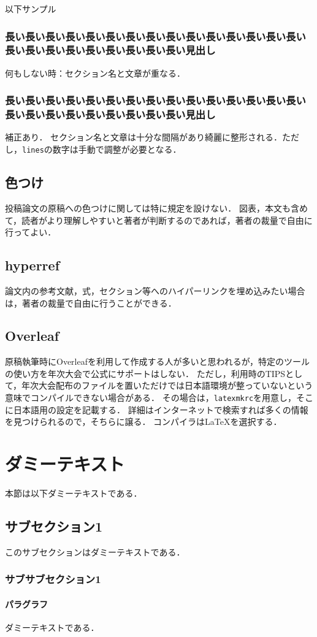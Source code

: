\documentclass[
  platex, dvipdfmx,  %
]{nlp2026}
\newcommand{\code}[1]{\texttt{#1}}
\begin{document}
以下サンプル

\subsubsection{長い長い長い長い長い長い長い長い長い長い長い長い長い長い長い長い長い長い長い長い長い長い長い長い見出し}

何もしない時：セクション名と文章が重なる．


\subsubsection{長い長い長い長い長い長い長い長い長い長い長い長い長い長い長い長い長い長い長い長い長い長い長い長い見出し}
\restoresection

補正あり．
セクション名と文章は十分な間隔があり綺麗に整形される．ただし，\code{lines}の数字は手動で調整が必要となる．


\subsection{色つけ}
投稿論文の原稿への色つけに関しては特に規定を設けない．
図表，本文も含めて，読者がより理解しやすいと著者が判断するのであれば，著者の裁量で自由に行ってよい．

\subsection{hyperref}
論文内の参考文献，式，セクション等へのハイパーリンクを埋め込みたい場合は，著者の裁量で自由に行うことができる．


\subsection{Overleaf}
原稿執筆時にOverleafを利用して作成する人が多いと思われるが，特定のツールの使い方を年次大会で公式にサポートはしない．
ただし，利用時のTIPSとして，年次大会配布のファイルを置いただけでは日本語環境が整っていないという意味でコンパイルできない場合がある．
その場合は，\code{latexmkrc}を用意し，そこに日本語用の設定を記載する．
詳細はインターネットで検索すれば多くの情報を見つけられるので，そちらに譲る．
コンパイラはLaTeXを選択する．

\section{ダミーテキスト}
本節は以下ダミーテキストである．

\subsection{サブセクション1}
このサブセクションはダミーテキストである．

\subsubsection{サブサブセクション1}

\paragraph{パラグラフ}
ダミーテキストである．
\end{document}
